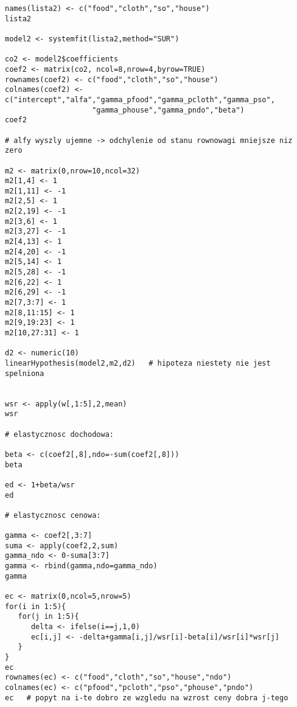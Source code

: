 \documentclass[11pt,a4paper]{report}
\begin{document}
\begin{small}
\begin{lstlisting}
names(lista2) <- c("food","cloth","so","house")
lista2

model2 <- systemfit(lista2,method="SUR")

co2 <- model2$coefficients
coef2 <- matrix(co2, ncol=8,nrow=4,byrow=TRUE)
rownames(coef2) <- c("food","cloth","so","house")
colnames(coef2) <- c("intercept","alfa","gamma_pfood","gamma_pcloth","gamma_pso",
                    "gamma_phouse","gamma_pndo","beta")
coef2

# alfy wyszly ujemne -> odchylenie od stanu rownowagi mniejsze niz zero

m2 <- matrix(0,nrow=10,ncol=32)
m2[1,4] <- 1
m2[1,11] <- -1
m2[2,5] <- 1
m2[2,19] <- -1
m2[3,6] <- 1
m2[3,27] <- -1
m2[4,13] <- 1
m2[4,20] <- -1
m2[5,14] <- 1
m2[5,28] <- -1
m2[6,22] <- 1
m2[6,29] <- -1
m2[7,3:7] <- 1
m2[8,11:15] <- 1
m2[9,19:23] <- 1
m2[10,27:31] <- 1

d2 <- numeric(10)
linearHypothesis(model2,m2,d2)   # hipoteza niestety nie jest spelniona


wsr <- apply(w[,1:5],2,mean)
wsr

# elastycznosc dochodowa:

beta <- c(coef2[,8],ndo=-sum(coef2[,8]))
beta

ed <- 1+beta/wsr
ed

# elastycznosc cenowa:

gamma <- coef2[,3:7]
suma <- apply(coef2,2,sum)
gamma_ndo <- 0-suma[3:7]
gamma <- rbind(gamma,ndo=gamma_ndo)
gamma

ec <- matrix(0,ncol=5,nrow=5)
for(i in 1:5){
   for(j in 1:5){
      delta <- ifelse(i==j,1,0)
      ec[i,j] <- -delta+gamma[i,j]/wsr[i]-beta[i]/wsr[i]*wsr[j]
   }
}
ec
rownames(ec) <- c("food","cloth","so","house","ndo")
colnames(ec) <- c("pfood","pcloth","pso","phouse","pndo")
ec   # popyt na i-te dobro ze wzgledu na wzrost ceny dobra j-tego
\end{lstlisting} 
\end{small} 
\end{document}

